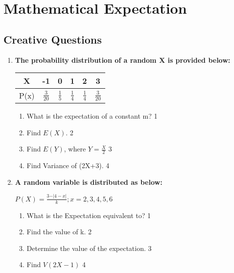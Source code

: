 \documentclass[a4paper,oneside, margin=1.4in]{book}
\begin{document}
\chapter{Mathematical Expectation} 

\section{Creative Questions}
  \begin{enumerate}
  
   \item
	  \textbf{The probability distribution of a random X is provided below:} 
	  
	  \begin{table}[h]
	  \centering
\begin{tabular}{c|ccccc}
X & -1 & 0 & 1 & 2 & 3 \\ \hline
P(x) & $\frac 3{20}$ & $\frac 15$ & $\frac 14$ & $\frac 14$ & $\frac 3{20}$
\end{tabular}
\end{table}
  
  \begin{enumerate}
    \item
	What is the expectation of a constant m? \hfill 1
    \item
	Find $E(X).$ \hfill 2
    \item  
	Find $E(Y)$, where $Y = \frac X2$  \hfill 3
    \item
	Find Variance of (2X+3). \hfill 4
  \end{enumerate}
  
        \item \textbf{A random variable is distributed as below:}
        
        \begin{center}
  \textbf{$P(X) = \frac{3-\vert 4-x\vert}{k}; x=2,3,4,5,6$}
  \end{center}

  \begin{enumerate}
    \item
	What is the Expectation equivalent to? \hfill 1
    \item
    	Find the value of k. \hfill 2
    \item
    	Determine the value of the expectation. \hfill 3
     \item
     	Find $V(2X-1)$ \hfill 4
  \end{enumerate}
  

\end{enumerate}
\end{document}
